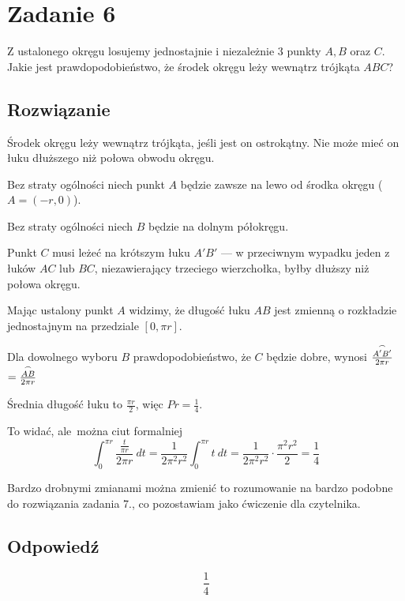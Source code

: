 \section*{Zadanie 6}
Z ustalonego okręgu losujemy jednostajnie i niezależnie 3 punkty
\(A, B\) oraz \(C\). Jakie jest prawdopodobieństwo, że środek okręgu
leży wewnątrz trójkąta \(ABC\)?

\subsection*{Rozwiązanie}
Środek okręgu leży wewnątrz trójkąta, jeśli jest on ostrokątny. Nie może
mieć on łuku dłuższego niż połowa obwodu okręgu.

Bez straty ogólności niech punkt \(A\) będzie zawsze na lewo od środka okręgu
(\(A = (-r, 0)\)).

Bez straty ogólności niech \(B\) będzie na dolnym półokręgu.

Punkt \(C\) musi leżeć na krótszym łuku \(A'B'\) --- w przeciwnym
wypadku jeden z łuków \(AC\) lub \(BC\), niezawierający trzeciego
wierzchołka, byłby dłuższy niż połowa okręgu.


Mając ustalony punkt \(A\) widzimy, że długość łuku \(AB\) jest
zmienną o rozkładzie jednostajnym na przedziale \([0, \pi r]\).

Dla dowolnego wyboru \(B\) prawdopodobieństwo, że \(C\) będzie dobre,
wynosi
\(\frac{\overset{\huge\frown}{A'B'}}{2\pi r}\)
\(= \frac{\overset{\huge\frown}{AB}}{2\pi r}\)

Średnia długość łuku to \(\frac{\pi r}2\), więc \(Pr = \frac 1 4\).

To widać, ale można ciut formalniej
\[
	\int_0^{\pi r} \frac{\frac{t}{\pi r}}{2\pi r}~dt
	= \frac{1}{2\pi^2r^2} \int_0^{\pi r} t~dt
	= \frac{1}{2\pi^2r^2} \cdot \frac {\pi^2r^2}2
	= \frac{1}{4}
\]

Bardzo drobnymi zmianami można zmienić to rozumowanie na bardzo podobne
do rozwiązania zadania 7., co pozostawiam jako ćwiczenie dla czytelnika.

\subsection*{Odpowiedź}
\[
	\boxed{\frac 1 4}
\]
